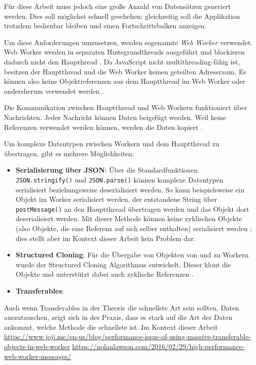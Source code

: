 Für diese Arbeit muss jedoch eine große Anzahl von Datensätzen generiert werden. Dies soll möglichst schnell geschehen; gleichzeitig soll die Applikation trotzdem bedienbar bleiben und einen Fortschrittsbalken anzeigen.

Um diese Anforderungen umzusetzen, werden sogenannte \textit{Web Worker} verwendet. Web Worker werden in separaten Hintegrundthreads ausgeführt und blockieren dadurch nicht den Haupthread \cite{mdn:webworkers}. Da JavaScript nicht multithreading-fähig ist, besitzen der Hauptthread und die Web Worker keinen geteilten Adressraum. Es können also keine Objektreferenzen aus dem Hauptthread im Web Worker oder andersherum verwendet werden \cite{mdn:webworkers}.

Die Kommunikation zwischen Hauptthread und Web Workern funktioniert über Nachrichten. Jeder Nachricht können Daten beigefügt werden. Weil keine Referenzen verwendet werden können, werden die Daten kopiert \cite{mdn:webworkers}.

Um komplexe Datentypen zwischen Workern und dem Hauptthread zu übertragen, gibt es mehrere Möglichkeiten:
\begin{itemize}
    \item \textbf{Serialisierung über JSON}: Über die Standardfunktionen \texttt{JSON.stringify()} und \texttt{JSON.parse()} können komplexe Datentypen serialisiert beziehungsweise deserialisiert werden. So kann beispielsweise ein Objekt im Worker serialisiert werden, der entstandene String über \texttt{postMessage()} an den Hauptthread übertragen werden und das Objekt dort deserialisiert werden. Mit dieser Methode können keine zyklischen Objekte (also Objekte, die eine Referenz auf sich selber enthalten) serialisiert werden \cite{mdn:json_stringify}; dies stellt aber im Kontext dieser Arbeit kein Problem dar.
    \item \textbf{Structured Cloning}: Für die Übergabe von Objekten von und zu Workern wurde der Structured Cloning Algorithmus entwickelt. Dieser klont die Objekte und unterstützt dabei auch zyklische Referenzen \cite{mdn:structured_cloning}.
    \item \textbf{Transferables}:
\end{itemize}

Auch wenn Transferables in der Theorie die schnellste Art sein sollten, Daten auszutauschen, zeigt sich in der Praxis, dass es stark auf die Art der Daten ankommt, welche Methode die schnellste ist. Im Kontext dieser Arbeit 
\url{https://www.joji.me/en-us/blog/performance-issue-of-using-massive-transferable-objects-in-web-worker}
\url{https://nolanlawson.com/2016/02/29/high-performance-web-worker-messages/}

